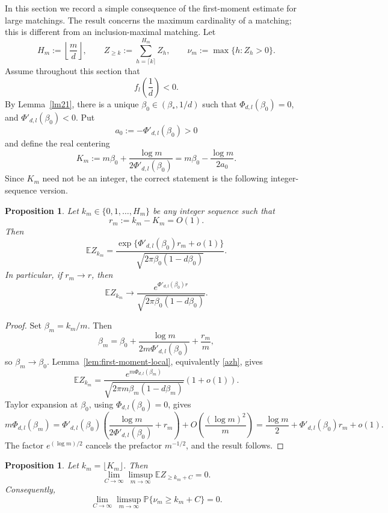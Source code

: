 \documentclass[11pt]{amsart}
\theoremstyle{plain}
\newtheorem{proposition}[theorem]{Proposition}
\numberwithin{equation}{section}
\numberwithin{theorem}{section}
\numberwithin{figure}{section}
\begin{document}
In this section we record a simple consequence of the first-moment estimate for large
matchings.  The result concerns the maximum cardinality of a matching; this is different
from an inclusion-maximal matching.  Let
\[
  H_m:=\left\lfloor \frac md\right\rfloor,
  \qquad
  Z_{\ge k}:=\sum_{h=\lceil k\rceil}^{H_m} Z_h,
  \qquad
  \nu_m:=\max\{h: Z_h>0\}.
\]
Assume throughout this section that
\[
 f_l\left(\frac1d\right)<0 .
\]
By Lemma~\ref{lm21}, there is a unique
\(\beta_0\in(\beta_*,1/d)\) such that
\(\Phi_{d,l}(\beta_0)=0\), and
\(\Phi'_{d,l}(\beta_0)<0\).  Put
\[
  a_0:=-\Phi'_{d,l}(\beta_0)>0
\]
and define the real centering
\begin{equation}
  K_m:=m\beta_0+\frac{\log m}{2\Phi'_{d,l}(\beta_0)}
      =m\beta_0-\frac{\log m}{2a_0} .
\label{dkm}
\end{equation}
Since \(K_m\) need not be an integer, the correct statement is the following integer-sequence
version.

\begin{proposition}\label{prop:local-large-matching-first-moment}
Let \(k_m\in\{0,1,\ldots,H_m\}\) be any integer sequence such that
\[
  r_m:=k_m-K_m=O(1).
\]
Then
\[
  \mathbb E Z_{k_m}
  =\frac{\exp\{\Phi'_{d,l}(\beta_0)r_m+o(1)\}}
  {\sqrt{2\pi\beta_0(1-d\beta_0)}} .
\]
In particular, if \(r_m\to r\), then
\[
  \mathbb E Z_{k_m}
  \longrightarrow
  \frac{e^{\Phi'_{d,l}(\beta_0)r}}
  {\sqrt{2\pi\beta_0(1-d\beta_0)}} .
\]
\end{proposition}

\begin{proof}
Set \(\beta_m=k_m/m\).  Then
\[
  \beta_m=\beta_0+\frac{\log m}{2m\Phi'_{d,l}(\beta_0)}+\frac{r_m}{m},
\]
so \(\beta_m\to\beta_0\).  Lemma~\ref{lem:first-moment-local}, equivalently
\eqref{azh}, gives
\[
  \mathbb E Z_{k_m}
  =\frac{e^{m\Phi_{d,l}(\beta_m)}}
  {\sqrt{2\pi m\beta_m(1-d\beta_m)}}(1+o(1)).
\]
Taylor expansion at \(\beta_0\), using \(\Phi_{d,l}(\beta_0)=0\), gives
\[
  m\Phi_{d,l}(\beta_m)
  =\Phi'_{d,l}(\beta_0)
   \left(\frac{\log m}{2\Phi'_{d,l}(\beta_0)}+r_m\right)
   +O\left(\frac{(\log m)^2}{m}\right)
  =\frac{\log m}{2}+\Phi'_{d,l}(\beta_0)r_m+o(1).
\]
The factor \(e^{(\log m)/2}\) cancels the prefactor \(m^{-1/2}\), and the result follows.
\end{proof}

\begin{proposition}\label{prop:large-matching-tail}
Let \(k_m=\lfloor K_m\rfloor\).  Then
\[
  \lim_{C\to\infty}\limsup_{m\to\infty}\mathbb E Z_{\ge k_m+C}=0.
\]
Consequently,
\[
  \lim_{C\to\infty}\limsup_{m\to\infty}
  \mathbb P\{\nu_m\ge k_m+C\}=0.
\]
\end{proposition}
\end{document}
